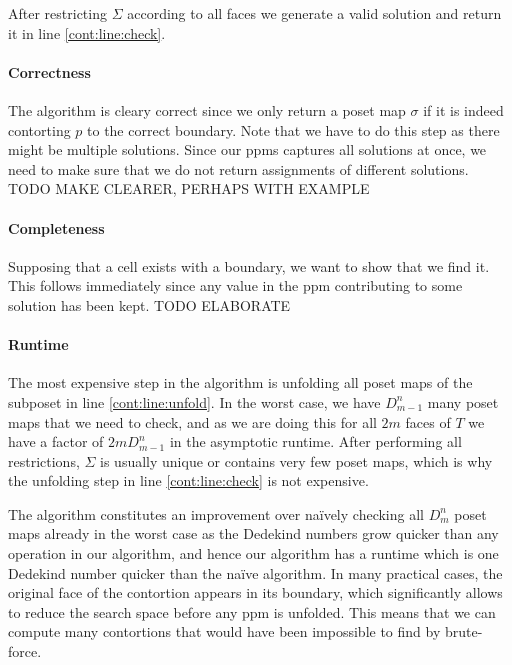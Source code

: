 \documentclass{llncs}
\begin{document}
After restricting $\Sigma$ according to all faces we generate a valid solution
and return it in line \ref{cont:line:check}.

\paragraph{Correctness}

The algorithm is cleary correct since we only return a poset map $\sigma$ if
it is indeed contorting $p$ to the correct boundary. Note that we have to do
this step as there might be multiple solutions. Since our ppms captures all
solutions at once, we need to make sure that we do not return assignments of
different solutions. TODO MAKE CLEARER, PERHAPS WITH EXAMPLE

\paragraph{Completeness}

Supposing that a cell exists with a boundary, we want to show that we find it.
This follows immediately since any value in the ppm contributing to some
solution has been kept. TODO ELABORATE

\paragraph*{Runtime}

The most expensive step in the algorithm is unfolding all poset maps of the
subposet in line \ref{cont:line:unfold}. In the worst case, we have $D_{m-1}^n$
many poset maps that we need to check, and as we are doing this for all $2m$
faces of $T$ we have a factor of $2 m D_{m-1}^n$ in the asymptotic runtime. After performing
all restrictions, $\Sigma$ is usually unique or contains very few poset maps,
which is why the unfolding step in line \ref{cont:line:check} is not expensive.

The algorithm constitutes an improvement over na\"ively checking all 
$D_m^n$ poset maps already in the worst case as the Dedekind
numbers grow quicker than any operation in our algorithm, and hence our
algorithm has a runtime which is one Dedekind number quicker than the na\"ive
algorithm. In many practical cases, the original face of the contortion
appears in its boundary, which significantly allows to reduce the search space
before any ppm is unfolded. This means that we can compute many contortions that
would have been impossible to find by brute-force.
\end{document}
